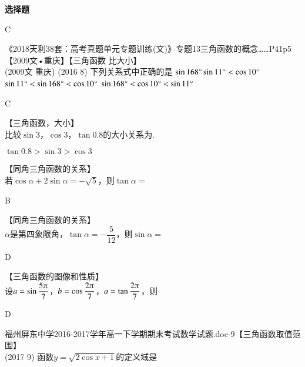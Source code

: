\begin{exercise}{\bf 选择题}
\begin{answer}
        C
      \end{answer}
    \item 《2018天利38套：高考真题单元专题训练(文)》专题13三角函数的概念……P41p5【2009文•重庆】【三角函数 比大小】\\
      {\kaishu (2009文 \textbullet 重庆)}
      (2016  8)
      下列关系式中正确的是\xz
       {$\sin168\degree\sin11\degree<\cos10\degree$}
       {$\sin11\degree<\sin168\degree<\cos10\degree$}
       {$\sin168\degree<\cos10\degree<\sin11\degree$}
      \begin{answer}
        C
      \end{answer}
    \item 【三角函数，大小】\\
      比较$\sin 3$，$\cos 3$，$\tan 0.8$的大小关系为\tk.
      \begin{answer}
        $\tan 0.8>\sin 3>\cos 3$
      \end{answer}
    \item 【同角三角函数的关系】\\
      若$\cos\alpha+2\sin\alpha=-\sqrt{5}$，则$\tan\alpha=$\xz
      \begin{answer}
        B
      \end{answer}
    \item 【同角三角函数的关系】\\
      $\alpha$是第四象限角，$\tan\alpha=-\dfrac5{12}$，则$\sin\alpha=$\xz
      \begin{answer}
        D
      \end{answer}
    \item 【三角函数的图像和性质】\\
      设$a=\sin{\dfracp57}$，$b=\cos{\dfracp27}$，$a=\tan{\dfracp27}$，则\xz
      \begin{answer}
        D
      \end{answer}
    \item 福州屏东中学2016-2017学年高一下学期期末考试数学试题.doc-9【三角函数取值范围】\\
      (2017  9)
      函数$y=\sqrt{2\cos x+1}$的定义域是\xz

\end{exercise}
